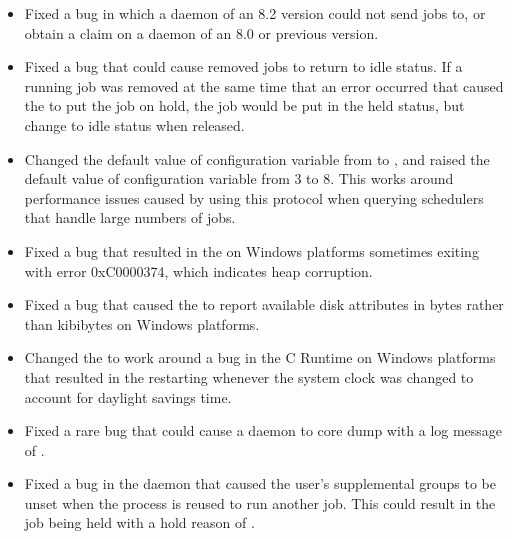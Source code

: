 \begin{itemize}

\item Fixed a bug in which a  daemon of an 8.2 version
could not send jobs to, 
or obtain a claim on a  daemon of an 8.0 or previous version.

\item Fixed a bug that could cause removed jobs to return to idle status.
If a running job was removed at the same time that an error occurred that
caused the  to put the job on hold, the job would be put
in the held status, but change to idle status when released.

\item Changed the default value of configuration variable
 from  to ,
and raised the default value of configuration variable
 from 3 to 8.
This works around  performance issues caused by using 
this protocol when querying schedulers that handle large numbers of jobs.

\item Fixed a bug that resulted in the  on Windows platforms
sometimes exiting with error 0xC0000374, 
which indicates heap corruption.

\item Fixed a bug that caused the  to report available disk
attributes in bytes rather than kibibytes on Windows platforms.

\item Changed the  to work around a bug in the C Runtime
on Windows platforms that resulted in the  restarting 
whenever the system clock was changed to account for daylight savings time.

\item Fixed a rare bug that could cause a daemon to core dump with
a log message of 
.

\item Fixed a bug in the  daemon that caused 
the user's supplemental
groups to be unset when the  process is reused 
to run another job.
This could result in the job being held with a hold reason of
.


\end{itemize}
